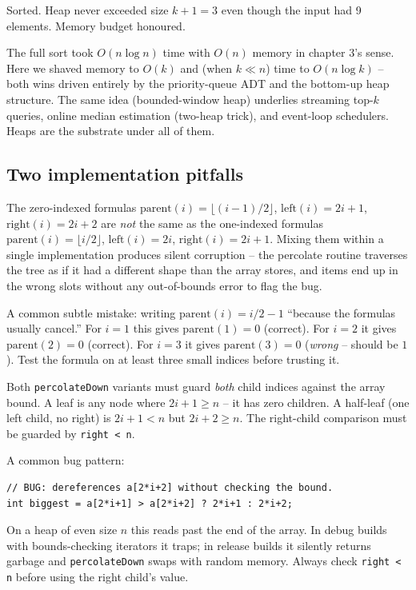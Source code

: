 \documentclass[11pt]{article}
\begin{document}
Sorted. Heap never exceeded size $k + 1 = 3$ even though the input
had 9 elements. Memory budget honoured.

\begin{ideabox}
The full sort took $O(n \log n)$ time with $O(n)$ memory in chapter
3's sense. Here we shaved memory to $O(k)$ and (when $k \ll n$) time
to $O(n \log k)$ -- both wins driven entirely by the priority-queue
ADT and the bottom-up heap structure. The same idea (bounded-window
heap) underlies streaming top-$k$ queries, online median estimation
(two-heap trick), and event-loop schedulers. Heaps are the substrate
under all of them.
\end{ideabox}

\subsection*{Two implementation pitfalls}

\begin{warnbox}
The zero-indexed formulas $\text{parent}(i) = \lfloor (i-1)/2
\rfloor$, $\text{left}(i) = 2i + 1$, $\text{right}(i) = 2i + 2$ are
\emph{not} the same as the one-indexed formulas $\text{parent}(i)
= \lfloor i/2 \rfloor$, $\text{left}(i) = 2i$, $\text{right}(i) = 2i +
1$. Mixing them within a single implementation produces silent
corruption -- the percolate routine traverses the tree as if it had a
different shape than the array stores, and items end up in the wrong
slots without any out-of-bounds error to flag the bug.

A common subtle mistake: writing $\text{parent}(i) = i / 2 - 1$
``because the formulas usually cancel.'' For $i = 1$ this gives
$\text{parent}(1) = 0$ (correct). For $i = 2$ it gives
$\text{parent}(2) = 0$ (correct). For $i = 3$ it gives
$\text{parent}(3) = 0$ (\emph{wrong} -- should be $1$). Test the
formula on at least three small indices before trusting it.
\end{warnbox}

\begin{warnbox}
Both \texttt{percolateDown} variants must guard \emph{both} child
indices against the array bound. A leaf is any node where
$2i + 1 \ge n$ -- it has zero children. A half-leaf (one left child,
no right) is $2i + 1 < n$ but $2i + 2 \ge n$. The right-child
comparison must be guarded by \texttt{right < n}.

A common bug pattern:
\begin{lstlisting}
// BUG: dereferences a[2*i+2] without checking the bound.
int biggest = a[2*i+1] > a[2*i+2] ? 2*i+1 : 2*i+2;
\end{lstlisting}
On a heap of even size $n$ this reads past the end of the array. In
debug builds with bounds-checking iterators it traps; in release
builds it silently returns garbage and \texttt{percolateDown} swaps
with random memory. Always check \texttt{right < n} before using the
right child's value.
\end{warnbox}
\end{document}
